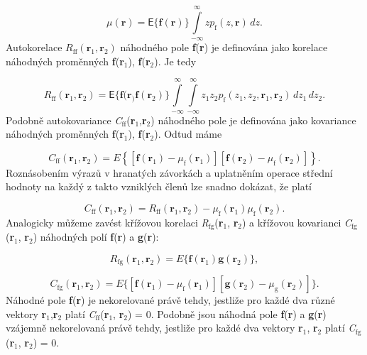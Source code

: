 \begin{equation} \label{eq:3_5}
    \mu(\mathbf{r}) = \mathsf{E}\{ \mathbf{f}(\mathbf{r}) \} \int\limits_{-\infty}^{\infty} z p_{\mathrm{f}}(z, \mathbf{r})\,dz.
\end{equation}
Autokorelace $R_\mathrm{ff}(\mathbf{r}_1, \mathbf{r}_2)$ náhodného pole \textbf{f}(\textbf{r}) je definována jako korelace náhodných proměnných \textbf{f}(\textbf{r}$_1$), \textbf{f}(\textbf{r}$_2$). Je tedy

\begin{equation} \label{eq:3_6}
    R_{\mathrm{ff}}(\mathbf{r}_1, \mathbf{r}_2) = \mathsf{E}\{ \mathbf{f}(\mathbf{r}_) \mathbf{f}(\mathbf{r}_2) \} \int\limits_{-\infty}^{\infty} \int\limits_{-\infty}^{\infty} z_1 z_2 p_\mathrm{f}(z_1, z_2, \mathbf{r}_1, \mathbf{r}_2 ) \,dz_1\,dz_2.
\end{equation}
Podobně autokovariance \textit{C}$_{\mathrm{ff}}$(\textbf{r}$_1$,\textbf{r}$_2$) náhodného pole je definována jako kovariance náhodných proměnných \textbf{f}(\textbf{r}$_1$), \textbf{f}(\textbf{r}$_2$). Odtud máme

\begin{equation} \label{eq:3_7}
    C_{\mathrm{ff}}(\mathbf{r}_1, \mathbf{r}_2) = E \left\{ \left[ \mathbf{f}(\mathbf{r}_1) - \mu_{\mathrm{f}}(\mathbf{r}_1) \right] \left[ \mathbf{f}(\mathbf{r}_2) - \mu_{\mathrm{f}}(\mathbf{r}_2) \right] \right\}.
\end{equation}
Roznásobením výrazů v hranatých závorkách a uplatněním operace střední hodnoty na každý z takto vzniklých členů lze snadno dokázat, že platí

\begin{equation} \label{eq:3_8}
    C_{\mathrm{ff}}(\mathbf{r}_1, \mathbf{r}_2) = R_{\mathrm{ff}}(\mathbf{r}_1, \mathbf{r}_2) - \mu_\mathrm{f}(\mathbf{r}_1) \mu_{\mathrm{f}}(\mathbf{r}_2).
\end{equation}
Analogicky můžeme zavést křížovou korelaci \textit{R}$_{\mathrm{fg}}$(\textbf{r}$_1$, \textbf{r}$_2$) a křížovou kovarianci \textit{C}$_{\mathrm{fg}}$(\textbf{r}$_1$, \textbf{r}$_2$) náhodných polí \textbf{f}(\textbf{r}) a \textbf{g}(\textbf{r}):

\begin{equation} \label{eq:3_9}
    R_{\mathrm{fg}}(\mathbf{r}_1, \mathbf{r}_2) = E\{ \mathbf{f}(\mathbf{r}_1) \mathbf{g}(\textbf{r}_2) \},
\end{equation}

\begin{equation} \label{eq:3_10}
    C_{\mathrm{fg}}(\mathbf{r}_1, \mathbf{r}_2) = E\{ [ \mathbf{f}(\mathbf{r}_1) - \mu_{\mathrm{f}}(\mathbf{r}_1) ] [ \mathbf{g}(\mathbf{r}_2) - \mu_{\mathrm{g}}(\mathbf{r}_2) ] \}.
\end{equation}
Náhodné pole \textbf{f}(\textbf{r}) je nekorelované právě tehdy, jestliže pro každé dva různé vektory \textbf{r}$_1$,\textbf{r}$_2$ platí \textit{C}$_{\mathrm{ff}}$(\textbf{r}$_1$, \textbf{r}$_2$) = 0. Podobně jsou náhodná pole \textbf{f}(\textbf{r}) a \textbf{g}(\textbf{r}) vzájemně nekorelovaná právě tehdy, jestliže pro každé dva vektory \textbf{r}$_1$, \textbf{r}$_2$ platí \textit{C}$_{\mathrm{fg}}$(\textbf{r}$_1$, \textbf{r}$_2$) = 0.

